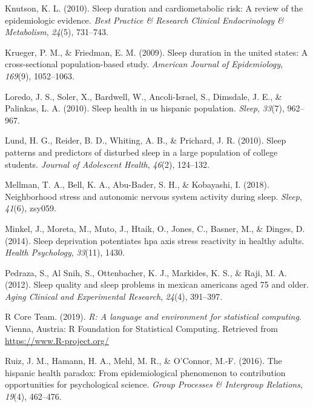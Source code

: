 \documentclass[
  man, fleqn, noextraspace]{apa6}
\begin{document}
\leavevmode\hypertarget{ref-knutson2010sleep}{}%
Knutson, K. L. (2010). Sleep duration and cardiometabolic risk: A review of the epidemiologic evidence. \emph{Best Practice \& Research Clinical Endocrinology \& Metabolism}, \emph{24}(5), 731--743.

\leavevmode\hypertarget{ref-krueger2009sleep}{}%
Krueger, P. M., \& Friedman, E. M. (2009). Sleep duration in the united states: A cross-sectional population-based study. \emph{American Journal of Epidemiology}, \emph{169}(9), 1052--1063.

\leavevmode\hypertarget{ref-loredo2010sleep}{}%
Loredo, J. S., Soler, X., Bardwell, W., Ancoli-Israel, S., Dimsdale, J. E., \& Palinkas, L. A. (2010). Sleep health in us hispanic population. \emph{Sleep}, \emph{33}(7), 962--967.

\leavevmode\hypertarget{ref-lund2010sleep}{}%
Lund, H. G., Reider, B. D., Whiting, A. B., \& Prichard, J. R. (2010). Sleep patterns and predictors of disturbed sleep in a large population of college students. \emph{Journal of Adolescent Health}, \emph{46}(2), 124--132.

\leavevmode\hypertarget{ref-mellman_2018_SNS}{}%
Mellman, T. A., Bell, K. A., Abu-Bader, S. H., \& Kobayashi, I. (2018). Neighborhood stress and autonomic nervous system activity during sleep. \emph{Sleep}, \emph{41}(6), zsy059.

\leavevmode\hypertarget{ref-minkel2014sleep}{}%
Minkel, J., Moreta, M., Muto, J., Htaik, O., Jones, C., Basner, M., \& Dinges, D. (2014). Sleep deprivation potentiates hpa axis stress reactivity in healthy adults. \emph{Health Psychology}, \emph{33}(11), 1430.

\leavevmode\hypertarget{ref-pedraza2012sleep}{}%
Pedraza, S., Al Snih, S., Ottenbacher, K. J., Markides, K. S., \& Raji, M. A. (2012). Sleep quality and sleep problems in mexican americans aged 75 and older. \emph{Aging Clinical and Experimental Research}, \emph{24}(4), 391--397.

\leavevmode\hypertarget{ref-R-base}{}%
R Core Team. (2019). \emph{R: A language and environment for statistical computing}. Vienna, Austria: R Foundation for Statistical Computing. Retrieved from \url{https://www.R-project.org/}

\leavevmode\hypertarget{ref-ruiz2016hispanic}{}%
Ruiz, J. M., Hamann, H. A., Mehl, M. R., \& O'Connor, M.-F. (2016). The hispanic health paradox: From epidemiological phenomenon to contribution opportunities for psychological science. \emph{Group Processes \& Intergroup Relations}, \emph{19}(4), 462--476.
\end{document}
